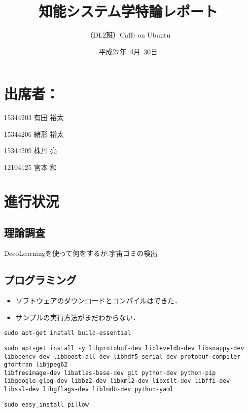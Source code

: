 \documentclass[a4paper,10pt]{jsarticle}
\title{知能システム学特論レポート}
\author{
（DL2班）Caffe on Ubuntu\\
}
\date{平成27年\ 4月\ 30日}
\begin{document}
\maketitle
\section{出席者：}
\begin{list}%
 {} %
 {} %
 \item 15344203 有田 裕太
 \item 15344206 緒形 裕太
 \item 15344209 株丹 亮
 \item 12104125 宮本 和
\end{list}
\section{進行状況}
\subsection{理論調査}
DeeoLearningを使って何をするか.宇宙ゴミの検出

\subsection{プログラミング}
\begin{itemize}
 \item ソフトウェアのダウンロードとコンパイルはできた．
 \item サンプルの実行方法がまだわからない．
\end{itemize}

\begin{lstlisting}[basicstyle=\ttfamily\footnotesize, frame=single]
sudo apt-get install build-essential
\end{lstlisting}

\begin{lstlisting}[basicstyle=\ttfamily\footnotesize, frame=single]
sudo apt-get install -y libprotobuf-dev libleveldb-dev libsnappy-dev
libopencv-dev libboost-all-dev libhdf5-serial-dev protobuf-compiler gfortran libjpeg62
libfreeimage-dev libatlas-base-dev git python-dev python-pip
libgoogle-glog-dev libbz2-dev libxml2-dev libxslt-dev libffi-dev
libssl-dev libgflags-dev liblmdb-dev python-yaml
\end{lstlisting}

\begin{lstlisting}[basicstyle=\ttfamily\footnotesize, frame=single]
sudo easy_install pillow
\end{lstlisting}
\end{document}
